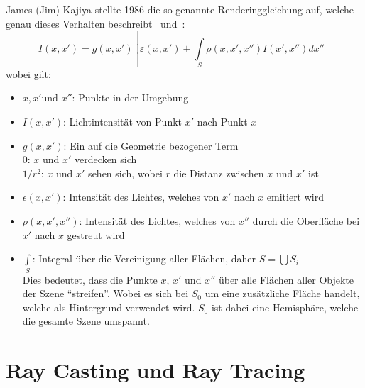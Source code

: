 James (Jim) Kajiya stellte 1986 die so genannte Renderinggleichung auf, welche
genau dieses Verhalten beschreibt~\cite{kajiya_rendering_1986}
und~\cite{foley_computer_1996}:
\begin{equation}
    I(x, x') = g(x, x')[\varepsilon(x, x') + \int\limits_{S}\rho(x, x', x'')I(x', x'')dx'']
\end{equation}
wobei gilt:

\begin{itemize}
    \item $x, x' \text{und } x''$: Punkte in der Umgebung
    \item $ I(x, x')$:            Lichtintensität von Punkt $x'$ nach Punkt $x$
    \item $ g(x, x')$:            Ein auf die Geometrie bezogener Term\\
                                  \hspace*{4mm} $0$:     \hspace*{6mm} $x$ und $x'$ verdecken sich\\
                                  \hspace*{4mm} $1/r^2$: \hspace*{1mm} $x$ und $x'$ sehen sich, wobei $r$ die Distanz zwischen $x$ und $x'$ ist
    \item $\epsilon(x, x')$:      Intensität des Lichtes, welches von $x'$ nach $x$ emitiert wird
    \item $\rho(x, x', x'')$:     Intensität des Lichtes, welches von $x''$
                                  durch die Oberfläche bei $x'$ nach $x$
                                  gestreut wird
    \item $\int\limits_{S}$:      Integral über die Vereinigung aller Flächen,
                                  daher $ S = \bigcup{S_{i}} $\\
                                      Dies bedeutet, dass die Punkte $x$, $x'$
                                      und $x''$ über alle Flächen aller Objekte
                                      der Szene ``streifen''.  Wobei es sich
                                      bei $S_{0}$ um eine zusätzliche Fläche
                                      handelt, welche als Hintergrund verwendet
                                      wird.  $S_{0}$ ist dabei eine Hemisphäre,
                                      welche die gesamte Szene umspannt.
\end{itemize}

\section{Ray Casting und Ray Tracing}
\label{sec:ray_casting_tracing}

